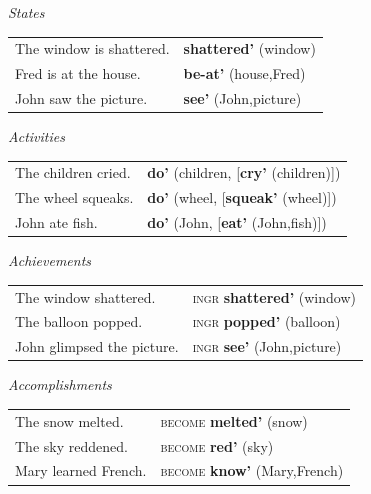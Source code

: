 \ea
\ea \textit{States} \\
\begin{tabular}{ll}
The window is shattered.&\textbf{shattered'} (window)\tabularnewline
Fred is at the house.&\textbf{be-at'} (house,Fred)\tabularnewline
John saw the picture.&\textbf{see'} (John,picture)\tabularnewline
\end{tabular}
\ex \textit{Activities} \\
\begin{tabular}{ll}
The children cried.&\textbf{do'} (children, [\textbf{cry'} (children)])\tabularnewline
The wheel squeaks.&\textbf{do'} (wheel, [\textbf{squeak'} (wheel)])\tabularnewline
John ate fish.&\textbf{do'} (John, [\textbf{eat'} (John,fish)])\tabularnewline
\end{tabular}
\ex \textit{Achievements} \\
\begin{tabular}{ll}
The window shattered.&\textsc{ingr} \textbf{shattered'} (window)\tabularnewline
The balloon popped.&\textsc{ingr} \textbf{popped'} (balloon)\tabularnewline
John glimpsed the picture.&\textsc{ingr} \textbf{see'} (John,picture)\tabularnewline
\end{tabular}
\ex \textit{Accomplishments} \\
\begin{tabular}{ll}
The snow melted.&\textsc{become} \textbf{melted'} (snow)\tabularnewline
The sky reddened.&\textsc{become} \textbf{red'} (sky)\tabularnewline
Mary learned French.&\textsc{become} \textbf{know'} (Mary,French)\tabularnewline
\end{tabular}
\z
\z


